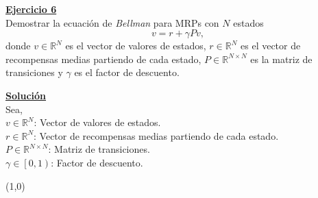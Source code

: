 \indent\underline{\textbf{Ejercicio 6}}\\
Demostrar la ecuación de \textit{Bellman} para MRPs con $N$ estados
\[
    v = r + \gamma Pv,
\]
donde $v \in \mathbb{R}^N$ es el vector de valores de estados, $r \in \mathbb{R}^N$ es el vector de recompensas medias partiendo
de cada estado, $P \in \mathbb{R}^{N \times N} $ es la matriz de transiciones y $\gamma$ es el factor de descuento.

\indent\underline{\textbf{Solución}}\\
Sea,\\
$v \in \mathbb{R}^N$: Vector de valores de estados.\\
$r \in \mathbb{R}^N$: Vector de recompensas medias partiendo de cada estado.\\
$P \in \mathbb{R}^{N \times N}$: Matriz de transiciones.\\
$\gamma \in \left[0,1\right)$: Factor de descuento.



\line(1,0){\textwidth}
